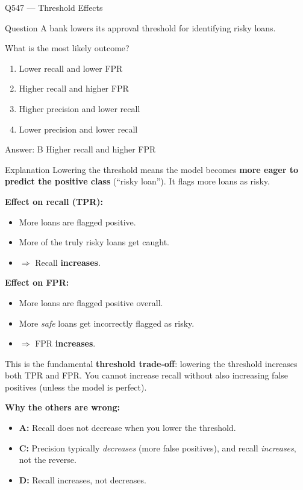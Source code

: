 \documentclass[aspectratio=169,8pt]{beamer}
\begin{document}
	\begin{frame}{Q547 --- Threshold Effects}
		\begin{block}{Question}
			A bank lowers its approval threshold for identifying risky loans.
			
			What is the most likely outcome?
			
			\begin{enumerate}
				\item Lower recall and lower FPR
				\item Higher recall and higher FPR
				\item Higher precision and lower recall
				\item Lower precision and lower recall
			\end{enumerate}
		\end{block}
		
		\begin{exampleblock}{Answer: B}
			Higher recall and higher FPR
		\end{exampleblock}
		
		\begin{block}{Explanation}
			Lowering the threshold means the model becomes \textbf{more eager to predict
				the positive class} (``risky loan''). It flags more loans as risky.
			
			\textbf{Effect on recall (TPR):}
			\begin{itemize}
				\item More loans are flagged positive.
				\item More of the truly risky loans get caught.
				\item \(\Rightarrow\) Recall \textbf{increases}.
			\end{itemize}
			
			\textbf{Effect on FPR:}
			\begin{itemize}
				\item More loans are flagged positive overall.
				\item More \emph{safe} loans get incorrectly flagged as risky.
				\item \(\Rightarrow\) FPR \textbf{increases}.
			\end{itemize}
			
			This is the fundamental \textbf{threshold trade-off}: lowering the threshold
			increases both TPR and FPR. You cannot increase recall without also
			increasing false positives (unless the model is perfect).
			
			\textbf{Why the others are wrong:}
			\begin{itemize}
				\item \textbf{A:} Recall does not decrease when you lower the threshold.
				\item \textbf{C:} Precision typically \emph{decreases} (more false positives),
				and recall \emph{increases}, not the reverse.
				\item \textbf{D:} Recall increases, not decreases.
			\end{itemize}
		\end{block}
	\end{frame}
	
\end{document}
